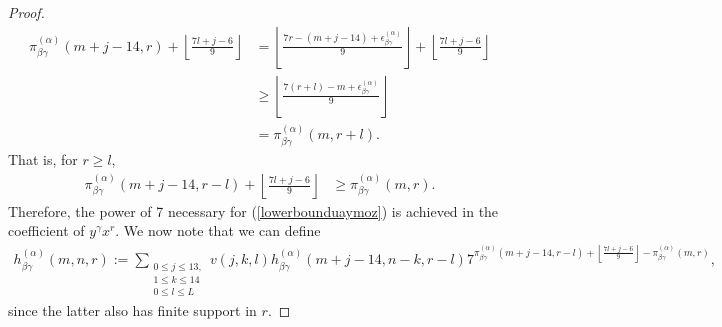 \documentclass[10pt,a4paper]{amsart}
\begin{document}
\begin{proof}
\begin{align*}
\pi^{(\alpha)}_{\beta\gamma}(m+j-14,r)+\left\lfloor \frac{7l+j-6}{9} \right\rfloor &= \left\lfloor \frac{7r-(m+j-14)+\epsilon^{(\alpha)}_{\beta\gamma}}{9} \right\rfloor +\left\lfloor \frac{7l+j-6}{9} \right\rfloor\\
&\ge \left\lfloor \frac{7(r+l)-m+\epsilon^{(\alpha)}_{\beta\gamma}}{9} \right\rfloor\\
&= \pi^{(\alpha)}_{\beta\gamma}(m,r+l).
\end{align*}  That is, for $r\ge l$,
\begin{align*}
\pi^{(\alpha)}_{\beta\gamma}(m+j-14,r-l)+\left\lfloor \frac{7l+j-6}{9} \right\rfloor &\ge \pi^{(\alpha)}_{\beta\gamma}(m,r).
\end{align*}  Therefore, the power of 7 necessary for (\ref{lowerbounduaymoz}) is achieved in the coefficient of $y^{\gamma}x^r$.  We now note that we can define
\begin{align*}
h^{(\alpha)}_{\beta\gamma}(m,n,r):=\sum_{\substack{0\le j\le 13,\\ 1\le k\le 14\\ 0\le l\le L}}v(j,k,l) h^{(\alpha)}_{\beta\gamma}(m+j-14,n-k,r-l) 7^{\pi^{(\alpha)}_{\beta\gamma}(m+j-14,r-l)+\left\lfloor \frac{7l+j-6}{9} \right\rfloor - \pi^{(\alpha)}_{\beta\gamma}(m,r)},
\end{align*} since the latter also has finite support in $r$.
\end{proof}
\end{document}
